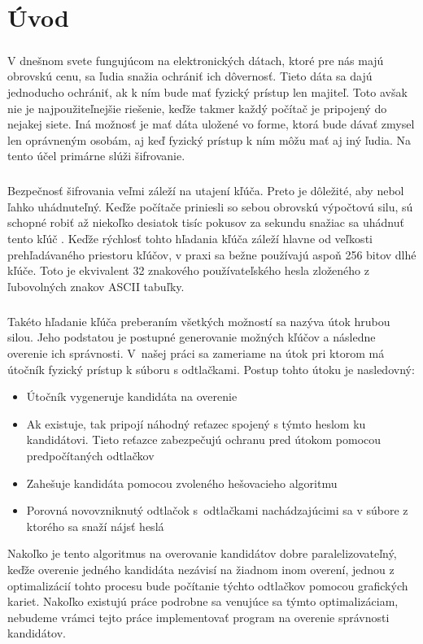 \chapter*{Úvod}
\paragraph{}
V dnešnom svete fungujúcom na elektronických dátach, ktoré pre nás majú obrovskú cenu, sa ľudia snažia ochrániť ich dôvernosť. Tieto dáta sa dajú jednoducho ochrániť, ak k ním bude mať fyzický prístup len majiteľ. Toto avšak nie je najpoužiteľnejšie riešenie, keďže takmer každý počítač je pripojený do nejakej siete. Iná možnosť je mať dáta uložené vo forme, ktorá bude dávať zmysel len oprávneným osobám, aj keď fyzický prístup k ním môžu mať aj iný ľudia. Na tento účel primárne slúži šifrovanie. 

\paragraph{}
Bezpečnosť šifrovania veľmi záleží na utajení kľúča. Preto je dôležité, aby nebol ľahko uhádnuteľný. Keďže počítače priniesli so sebou obrovskú výpočtovú silu, sú schopné robiť až niekoľko desiatok tisíc pokusov za sekundu snažiac sa uhádnuť tento kľúč \cite{gpu25}. Keďže rýchlosť tohto hľadania kľúča záleží hlavne od veľkosti prehľadávaného priestoru kľúčov, v praxi sa bežne používajú aspoň 256 bitov dlhé kľúče. Toto je ekvivalent 32 znakového používateľského hesla zloženého z ľubovolných znakov ASCII tabuľky.

\paragraph{}
Takéto hľadanie kľúča preberaním všetkých možností sa nazýva útok hrubou silou. Jeho podstatou je postupné generovanie možných kľúčov a následne overenie ich správnosti. V~našej práci sa zameriame na útok pri ktorom má útočník fyzický prístup k súboru s odtlačkami. Postup tohto útoku je nasledovný:
\begin{itemize}
	\item Útočník vygeneruje kandidáta na overenie
	\item Ak existuje, tak pripojí náhodný reťazec spojený s týmto heslom ku kandidátovi. Tieto reťazce zabezpečujú ochranu pred útokom pomocou predpočítaných odtlačkov
	\item Zahešuje kandidáta pomocou zvoleného hešovacieho algoritmu
	\item Porovná novovzniknutý odtlačok s~odtlačkami nachádzajúcimi sa v súbore z ktorého sa snaží nájsť heslá
\end{itemize}
Nakoľko je tento algoritmus na overovanie kandidátov dobre paralelizovateľný, keďže overenie jedného kandidáta nezávisí na žiadnom inom overení, jednou z optimalizácií tohto procesu bude počítanie týchto odtlačkov pomocou grafických kariet. Nakoľko existujú práce \cite{5665047} podrobne sa venujúce sa týmto optimalizáciam, nebudeme vrámci tejto práce implementovať program na overenie správnosti kandidátov. 

